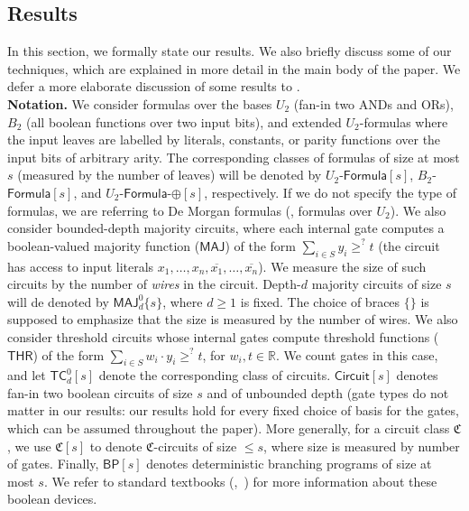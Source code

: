 \documentclass{toc}
\begin{document}
\subsection{Results}\label{ss:results}

In this section, we formally state our results. We also briefly discuss some of our techniques, which are explained in more detail in the main body of the paper. We defer a more elaborate discussion of some results to .\\

\noindent \textbf{Notation.} We consider formulas over the bases $U_2$ (fan-in two ANDs and ORs), $B_2$ (all boolean functions over two input bits), and extended $U_2$-formulas where the input leaves are labelled by literals, constants, or parity functions over the input bits of arbitrary arity. The corresponding classes of formulas of size at most $s$ (measured by the number of leaves) will be denoted by $U_2$-$\mathsf{Formula}[s]$, $B_2$-$\mathsf{Formula}[s]$, and $U_2$-$\mathsf{Formula}$-$\oplus[s]$, respectively. If we do not specify the type of formulas, we are referring to De Morgan formulas (\ie, formulas over $U_2$). We also consider bounded-depth majority circuits, where each internal gate computes a boolean-valued majority function ($\mathsf{MAJ}$) of the form $\sum_{i \in S} y_i \geq^? t$ (the circuit has access to input literals $x_1, \ldots, x_n, \overline{x_1}, \ldots, \overline{x_n}$). We measure the size of such circuits by the number of \emph{wires} in the circuit. Depth-$d$ majority circuits of size $s$ will de denoted by $\mathsf{MAJ}^0_d\{s\}$, where $d\geq 1$ is fixed. The choice of %
braces  %
$\{\}$ is supposed to emphasize that the size is measured by the number of wires. We also consider threshold circuits whose
internal gates compute %
threshold functions  %
($\mathsf{THR}$) of the form $\sum_{i \in S} w_i \cdot y_i \geq^? t$, for $w_i, t \in \mathbb{R}$. We count %
gates in this case, and let $\mathsf{TC}^0_d[s]$ denote the corresponding class of circuits. $\mathsf{Circuit}[s]$ denotes fan-in two boolean circuits of size $s$ and of unbounded depth (gate types do not matter in our results: our results hold for every fixed choice of basis for the gates, which can be assumed throughout the paper). More generally, for a circuit class $\mathfrak{C}$, we use $\mathfrak{C}[s]$ to denote $\mathfrak{C}$-circuits of size $\leq s$, where size is measured by number of gates. Finally, $\mathsf{BP}[s]$ denotes deterministic branching programs of size at most $s$. We refer to
%
standard textbooks
%
(\eg,~\cite{DBLP:books/daglib/0028687})   %
for more information about these boolean devices.\\
\end{document}
